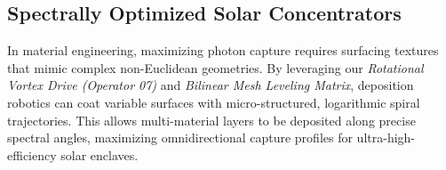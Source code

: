 \documentclass[11pt,twocolumn]{article}
\begin{document}
\subsection{Spectrally Optimized Solar Concentrators}
In material engineering, maximizing photon capture requires surfacing textures that mimic complex non-Euclidean geometries. By leveraging our \textit{Rotational Vortex Drive (Operator 07)} and \textit{Bilinear Mesh Leveling Matrix}, deposition robotics can coat variable surfaces with micro-structured, logarithmic spiral trajectories. This allows multi-material layers to be deposited along precise spectral angles, maximizing omnidirectional capture profiles for ultra-high-efficiency solar enclaves.
\end{document}
